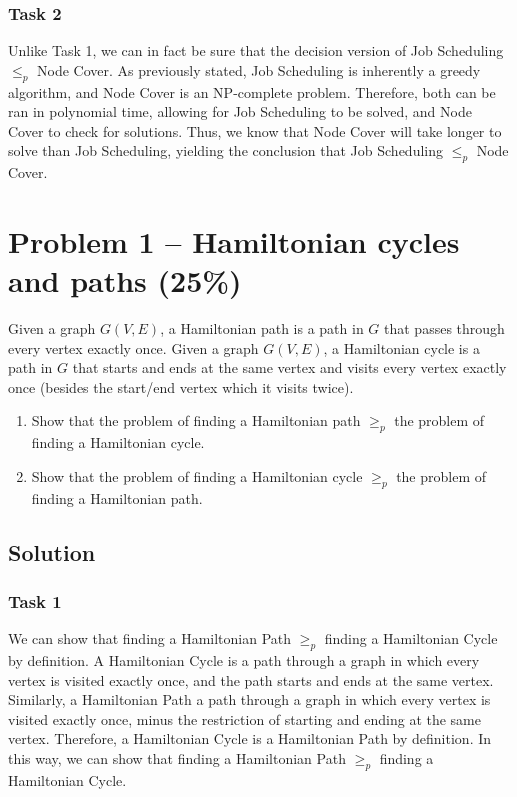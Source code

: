 \documentclass[12pt,letterpaper]{article}
\begin{document}
\subsubsection*{Task 2}

Unlike Task 1, we can in fact be sure that the decision version of Job Scheduling $\leq_p$ Node Cover. As previously stated, Job Scheduling is inherently a greedy algorithm, and Node Cover is an NP-complete problem. Therefore, both can be ran in polynomial time, allowing for Job Scheduling to be solved, and Node Cover to check for solutions. Thus, we know that Node Cover will take longer to solve than Job Scheduling, yielding the conclusion that Job Scheduling $\leq_p$ Node Cover. 

\newpage
\section*{Problem 1 -- Hamiltonian cycles and paths (25\%)}
Given a graph $G(V,E)$, a Hamiltonian path is a path in $G$ that passes through every vertex exactly once.
Given a graph $G(V,E)$, a Hamiltonian cycle is a path in $G$ that starts and ends at the same vertex and visits every vertex exactly once (besides the start/end vertex which it visits twice).

\begin{enumerate}
    \item Show that the problem of finding a Hamiltonian path $\geq_p$ the problem of finding a Hamiltonian cycle.
    \item Show that the problem of finding a Hamiltonian cycle $\geq_p$ the problem of finding a Hamiltonian path.
\end{enumerate}

\subsection*{Solution}

\subsubsection*{Task 1}

We can show that finding a Hamiltonian Path $\geq_p$ finding a Hamiltonian Cycle by definition. A Hamiltonian Cycle is a path through a graph in which every vertex is visited exactly once, and the path starts and ends at the same vertex. Similarly, a Hamiltonian Path a path through a graph in which every vertex is visited exactly once, minus the restriction of starting and ending at the same vertex. Therefore, a Hamiltonian Cycle is a Hamiltonian Path by definition. In this way, we can show that finding a Hamiltonian Path $\geq_p$ finding a Hamiltonian Cycle.
\end{document}
